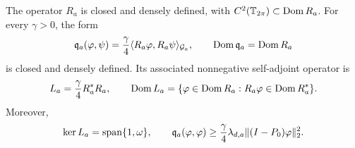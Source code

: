 \begin{theorem}
\label{pin:closed-theorem}
The operator $R_a$ is closed and densely defined, with
$C^2(\mathbb T_{2\pi})\subset\operatorname{Dom} R_a$. For every $\gamma>0$, the form
\begin{equation}
 \mathfrak q_a(\varphi,\psi)=\frac\gamma4
                 \langle R_a\varphi,R_a\psi\rangle_{\mathcal G_a},
 \qquad \operatorname{Dom}\mathfrak q_a=\operatorname{Dom} R_a
 \label{pin:closed-form}
\end{equation}
is closed and densely defined. Its associated nonnegative self-adjoint
operator is
\begin{equation}
 L_a=\frac\gamma4R_a^*R_a,\qquad
 \operatorname{Dom} L_a=\{\varphi\in\operatorname{Dom} R_a:R_a\varphi\in\operatorname{Dom} R_a^*\}.
 \label{pin:selfadjoint-operator}
\end{equation}
Moreover,
\begin{equation}
 \operatorname{ker} L_a=\operatorname{span}\{1,\omega\},\qquad
 \mathfrak q_a(\varphi,\varphi)
   \ge\frac\gamma4\lambda_{d,a}\|(I-P_0)\varphi\|_2^2.
 \label{pin:operator-gap}
\end{equation}
\end{theorem}

